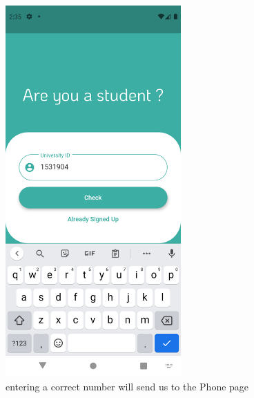 \documentclass[12pt]{article}
\begin{document}
\begin{figure}[h!]
\centerline{\includegraphics[width=0.6\textwidth]{./Screenshots/5.PNG}}
  \caption{entering a correct number will send us to the Phone page}
\end{figure}
\end{document}
